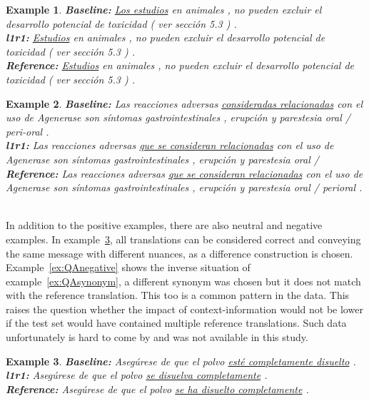 \documentclass[smallextended]{svjour3}       %
\theoremstyle{break}
\newtheorem{exmp}{Example}[section]
\begin{document}
\begin{exmp}
\footnotesize
\label{ex:QAdrop}
\textbf{Baseline:} \underline{Los estudios} en animales , no pueden excluir el desarrollo potencial de toxicidad ( ver sección 5.3 ) . \\
\textbf{l1r1:} \underline{Estudios} en animales , no pueden excluir el desarrollo potencial de toxicidad ( ver sección 5.3 ) . \\
\textbf{Reference:} \underline{Estudios} en animales , no pueden excluir el desarrollo potencial de toxicidad ( ver sección 5.3 ) .
\end{exmp}

\begin{exmp}
\footnotesize
\label{ex:QAgrammar}
\textbf{Baseline:} Las reacciones adversas \underline{consideradas relacionadas} con el uso de Agenerase son síntomas gastrointestinales , erupción y parestesia oral / peri-oral . \\
\textbf{l1r1:}  Las reacciones adversas \underline{que se consideran relacionadas} con el uso de Agenerase son síntomas gastrointestinales , erupción y parestesia oral / \\
\textbf{Reference:} Las reacciones adversas \underline{que se consideran relacionadas} con el uso de Agenerase son síntomas gastrointestinales , erupción y parestesia oral / perioral . \\ \\
\end{exmp}

In addition to the positive examples, there are also neutral and negative examples. In example~\ref{ex:QAneutral}, all translations can be considered correct and conveying the same message with different nuances, as a difference construction is chosen. Example~\ref{ex:QAnegative} shows the inverse situation of example~\ref{ex:QAsynonym}, a different synonym was chosen but it does not match with the reference translation. This too is a common pattern in the data. This raises the question whether the impact of context-information would not be lower if the test set would have contained multiple reference translations. Such data unfortunately is hard to come by and was not available in this study.

\begin{exmp}
\footnotesize
\label{ex:QAneutral}
\textbf{Baseline:} Asegúrese de que el polvo \underline{esté completamente disuelto} . \\
\textbf{l1r1:} Asegúrese de que el polvo \underline{se disuelva completamente} .  \\
\textbf{Reference:} Asegúrese de que el polvo \underline{se ha disuelto completamente} .
\end{exmp}
\end{document}
